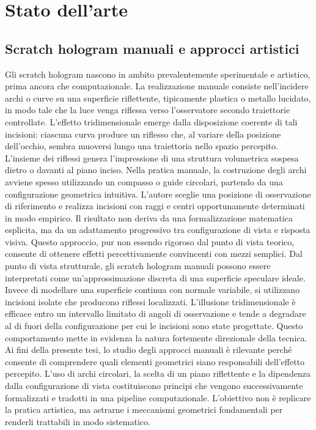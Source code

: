 \documentclass[a4paper,11pt,titlepage,twoside]{book}
\newcommand{\1}{\mathbf{1}}
\numberwithin{equation}{chapter}
\theoremstyle{plain}
\theoremstyle{definition}
\begin{document}
	
	\chapter{Stato dell’arte}
	
	\section{Scratch hologram manuali e approcci artistici}
	
	Gli scratch hologram nascono in ambito prevalentemente sperimentale e artistico, prima ancora che computazionale. La realizzazione manuale consiste nell’incidere archi o curve su una superficie riflettente, tipicamente plastica o metallo lucidato, in modo tale che la luce venga riflessa verso l’osservatore secondo traiettorie controllate. L’effetto tridimensionale emerge dalla disposizione coerente di tali incisioni: ciascuna curva produce un riflesso che, al variare della posizione dell’occhio, sembra muoversi lungo una traiettoria nello spazio percepito. L’insieme dei riflessi genera l’impressione di una struttura volumetrica sospesa dietro o davanti al piano inciso.
	Nella pratica manuale, la costruzione degli archi avviene spesso utilizzando un compasso o guide circolari, partendo da una configurazione geometrica intuitiva. L’autore sceglie una posizione di osservazione di riferimento e realizza incisioni con raggi e centri opportunamente determinati in modo empirico. Il risultato non deriva da una formalizzazione matematica esplicita, ma da un adattamento progressivo tra configurazione di vista e risposta visiva. Questo approccio, pur non essendo rigoroso dal punto di vista teorico, consente di ottenere effetti percettivamente convincenti con mezzi semplici.
	Dal punto di vista strutturale, gli scratch hologram manuali possono essere interpretati come un’approssimazione discreta di una superficie speculare ideale. Invece di modellare una superficie continua con normale variabile, si utilizzano incisioni isolate che producono riflessi localizzati. L’illusione tridimensionale è efficace entro un intervallo limitato di angoli di osservazione e tende a degradare al di fuori della configurazione per cui le incisioni sono state progettate. Questo comportamento mette in evidenza la natura fortemente direzionale della tecnica.
	Ai fini della presente tesi, lo studio degli approcci manuali è rilevante perché consente di comprendere quali elementi geometrici siano responsabili dell’effetto percepito. L’uso di archi circolari, la scelta di un piano riflettente e la dipendenza dalla configurazione di vista costituiscono principi che vengono successivamente formalizzati e tradotti in una pipeline computazionale. L’obiettivo non è replicare la pratica artistica, ma astrarne i meccanismi geometrici fondamentali per renderli trattabili in modo sistematico.
\end{document}
